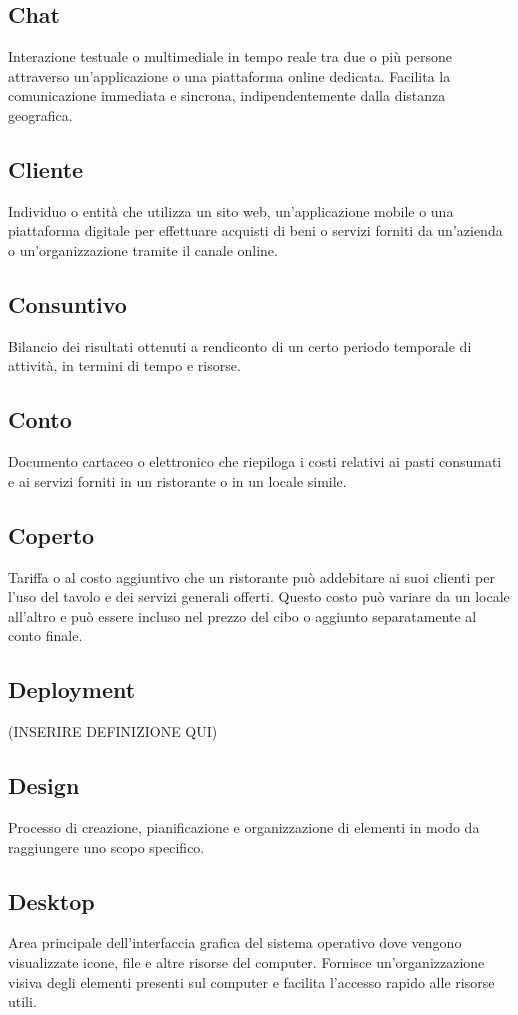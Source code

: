 \subsection{Chat}Interazione testuale o multimediale in tempo reale tra due o più persone attraverso un'applicazione o una piattaforma online dedicata. Facilita la comunicazione immediata e sincrona, indipendentemente dalla distanza geografica.
\subsection{Cliente}Individuo o entità che utilizza un sito web, un'applicazione mobile o una piattaforma digitale per effettuare acquisti di beni o servizi forniti da un'azienda o un'organizzazione tramite il canale online.
\subsection{Consuntivo}Bilancio dei risultati ottenuti a rendiconto di un certo periodo temporale di attività, in termini di tempo e risorse.
\subsection{Conto}Documento cartaceo o elettronico che riepiloga i costi relativi ai pasti consumati e ai servizi forniti in un ristorante o in un locale simile.
\subsection{Coperto}Tariffa o al costo aggiuntivo che un ristorante può addebitare ai suoi clienti per l'uso del tavolo e dei servizi generali offerti. Questo costo può variare da un locale all'altro e può essere incluso nel prezzo del cibo o aggiunto separatamente al conto finale.
\subsection{Deployment} (INSERIRE DEFINIZIONE QUI)
\subsection{Design}Processo di creazione, pianificazione e organizzazione di elementi in modo da raggiungere uno scopo specifico.
\subsection{Desktop}Area principale dell'interfaccia grafica del sistema operativo dove vengono visualizzate icone, file e altre risorse del computer. Fornisce un'organizzazione visiva degli elementi presenti sul computer e facilita l'accesso rapido alle risorse utili.

